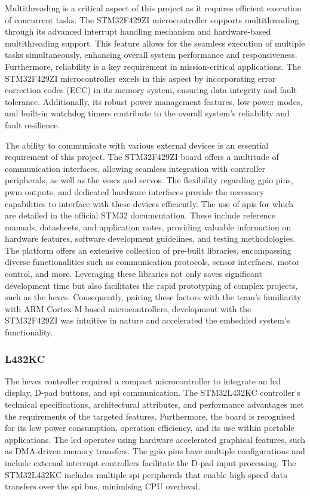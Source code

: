 \documentclass [12pt]{article}
\begin{document}
Multithreading is a critical aspect of this project as it requires efficient execution of concurrent tasks. The STM32F429ZI microcontroller supports multithreading through its advanced interrupt handling mechanism and hardware-based multithreading support. This feature allows for the seamless execution of multiple tasks simultaneously, enhancing overall system performance and responsiveness. Furthermore, reliability is a key requirement in mission-critical applications. The STM32F429ZI microcontroller excels in this aspect by incorporating error correction codes (ECC) in its memory system, ensuring data integrity and fault tolerance. Additionally, its robust power management features, low-power modes, and built-in watchdog timers contribute to the overall system's reliability and fault resilience. 

The ability to communicate with various external devices is an essential requirement of this project. The STM32F429ZI board offers a multitude of communication interfaces, allowing seamless integration with controller peripherals, as well as the \gls{vesc}s and servos. The flexibility regarding \gls{gpio} pins, \gls{pwm} outputs, and dedicated hardware interfaces provide the necessary capabilities to interface with these devices efficiently. The use of \gls{api}s for which are detailed in the official STM32 documentation. These include reference manuals, datasheets, and application notes, providing valuable information on hardware features, software development guidelines, and testing methodologies. The platform offers an extensive collection of pre-built libraries, encompassing diverse functionalities such as communication protocols, sensor interfaces, motor control, and more. Leveraging these libraries not only saves significant development time but also facilitates the rapid prototyping of complex projects, such as the \gls{hevcs}. Consequently, pairing these factors with the team’s familiarity with ARM Cortex-M based microcontrollers, development with the STM32F429ZI was intuitive in nature and accelerated the embedded system’s functionality. 

\subsubsection{L432KC}
The \gls{hevcs} controller required a compact microcontroller to integrate an \gls{lcd} display, D-pad buttons, and \gls{spi} communication. The STM32L432KC controller’s technical specifications, architectural attributes, and performance advantages met the requirements of the targeted features. Furthermore, the board is recognised for its low power consumption, operation efficiency, and its use within portable applications. The \gls{lcd} operates using hardware accelerated graphical features, such as DMA-driven memory transfers. The \gls{gpio} pins have multiple configurations and include external interrupt controllers facilitate the D-pad input processing. The STM32L432KC includes multiple \gls{spi} peripherals that enable high-speed data transfers over the \gls{spi} bus, minimising CPU overhead.  
\end{document}
